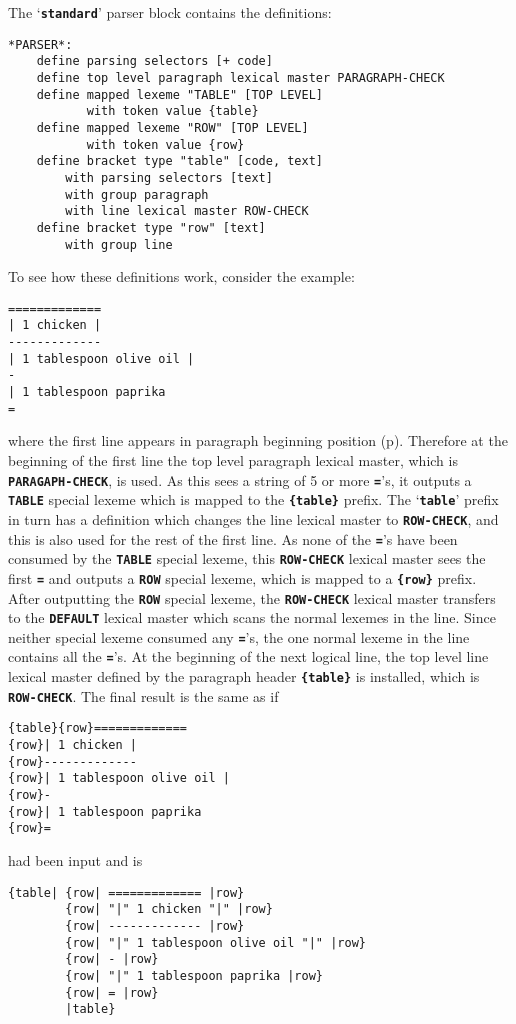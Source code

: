 \documentclass[12pt]{article}
\newcommand{\TT}[1]{{\tt \bfseries #1}}
\newcommand{\pagref}[1]{p\pageref{#1}}
\newenvironment{indpar}[1][0.3in]%
	{\begin{list}{}%
		     {\setlength{\itemsep}{0in}%
		      \setlength{\topsep}{0in}%
		      \setlength{\parsep}{1ex}%
		      \setlength{\labelwidth}{#1}%
		      \setlength{\leftmargin}{#1}%
		      \addtolength{\leftmargin}{\labelsep}}%
	 \item}%
	{\end{list}}
\begin{document}
The `\TT{standard}' parser block contains the definitions:
\begin{indpar}\begin{verbatim}
*PARSER*:
    define parsing selectors [+ code]
    define top level paragraph lexical master PARAGRAPH-CHECK
    define mapped lexeme "TABLE" [TOP LEVEL]
           with token value {table}
    define mapped lexeme "ROW" [TOP LEVEL]
           with token value {row}
    define bracket type "table" [code, text]
        with parsing selectors [text]
        with group paragraph
        with line lexical master ROW-CHECK
    define bracket type "row" [text]
        with group line
\end{verbatim}\end{indpar}

To see how these definitions work, consider the example:
\begin{indpar}\begin{verbatim}
=============
| 1 chicken |
-------------
| 1 tablespoon olive oil |
-
| 1 tablespoon paprika
=
\end{verbatim}\end{indpar}
where the first line appears in paragraph beginning position
(\pagref{PARAGRAPH-BEGINNING-POSITION}).
Therefore at the beginning of the first line the top level
paragraph lexical master, which is \TT{PARAGAPH-CHECK}, is used.
As this
sees a string of 5 or more \TT{=}'s, it outputs a \TT{TABLE}
special lexeme which is mapped to the \TT{\{table\}} prefix.
The `\TT{table}' prefix in turn has a definition which
changes the line lexical master to \TT{ROW-CHECK}, and this
is also used for the rest of the first line.  As none
of the \TT{=}'s have been consumed by the \TT{TABLE} special
lexeme, this \TT{ROW-CHECK} lexical master sees the first \TT{=} and
outputs a \TT{ROW} special lexeme, which is mapped to a
\TT{\{row\}} prefix.  After outputting the \TT{ROW} special
lexeme, the \TT{ROW-CHECK} lexical master transfers to the
\TT{DEFAULT} lexical master which scans the normal lexemes
in the line.  Since neither special lexeme consumed any \TT{=}'s,
the one normal lexeme in the line contains all the
\TT{=}'s.  At the beginning of the next logical line, the
top level line lexical master defined by the paragraph header
\TT{\{table\}} is installed, which is
\TT{ROW-CHECK}.  The final result is the same as if
\begin{indpar}\begin{verbatim}
{table}{row}=============
{row}| 1 chicken |
{row}-------------
{row}| 1 tablespoon olive oil |
{row}-
{row}| 1 tablespoon paprika
{row}=
\end{verbatim}\end{indpar}
had been input and is
\begin{indpar}\begin{verbatim}
{table| {row| ============= |row}
        {row| "|" 1 chicken "|" |row}
        {row| ------------- |row}
        {row| "|" 1 tablespoon olive oil "|" |row}
        {row| - |row}
        {row| "|" 1 tablespoon paprika |row}
        {row| = |row}
        |table}
\end{verbatim}\end{indpar}
\end{document}
